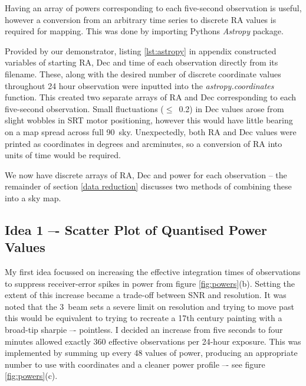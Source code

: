 \documentclass[a4paper]{jpconf}
\begin{document}
\begin{multicols}{2}
Having an array of powers corresponding to each five-second observation is useful, however a conversion from an arbitrary time series to discrete RA values is required for mapping. This was done by importing Python\textquotesingle s \textit{Astropy} package. 

Provided by our demonstrator, listing \ref{lst:astropy} in appendix constructed variables of starting RA, Dec and time of each observation directly from its filename. These, along with the desired number of discrete coordinate values throughout 24 hour observation were inputted into the \textit{astropy.coordinates} function. This created two separate arrays of RA and Dec corresponding to each five-second observation. Small fluctuations ($\leq$~0.2\degree) in Dec values arose from slight wobbles in SRT motor positioning, however this would have little bearing on a map spread across full 90\degree~sky. Unexpectedly, both RA and Dec values were printed as coordinates in degrees and arcminutes, so a conversion of RA into units of time would be required. 

We now have discrete arrays of RA, Dec and power for each observation -- the remainder of section \ref{data reduction} discusses two methods of combining these into a sky map.

\subsection{Idea 1 –- Scatter Plot of Quantised Power Values} \label{idea1}

My first idea focussed on increasing the effective integration times of observations to suppress receiver-error spikes in power from figure \ref{fig:powers}(b). Setting the extent of this increase became a trade-off between SNR and resolution. It was noted that the 3\degree~beam sets a severe limit on resolution and trying to move past this would be equivalent to trying to recreate a 17th century painting with a broad-tip sharpie –- pointless. I decided an increase from five seconds to four minutes allowed exactly 360 effective observations per 24-hour exposure. This was implemented by summing up every 48 values of power, producing an appropriate number to use with coordinates and a cleaner power profile –- see figure \ref{fig:powers}(c). 


\end{multicols}
\end{document}
